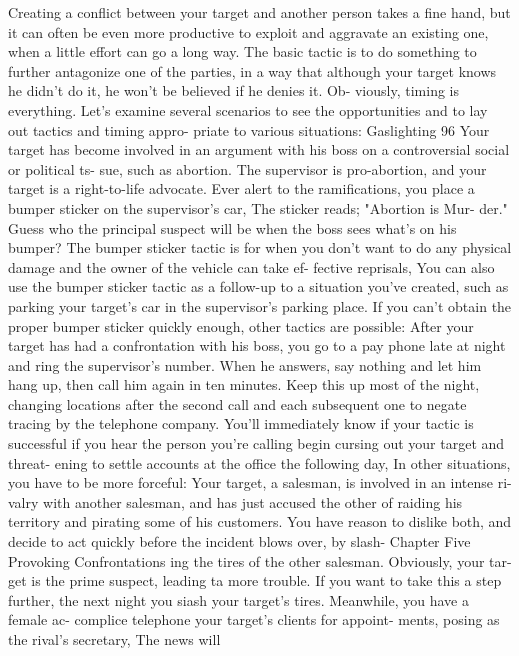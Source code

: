 \documentclass{book}
\begin{document}
Creating a conflict between your target and another person 
takes a fine hand, but it can often be even more productive to 
exploit and aggravate an existing one, when a little effort can 
go a long way. The basic tactic is to do something to further 
antagonize one of the parties, in a way that although your target 
knows he didn't do it, he won't be believed if he denies it. Ob- 
viously, timing is everything. Let's examine several scenarios to 
see the opportunities and to lay out tactics and timing appro- 
priate to various situations:  Gaslighting 
96 
Your target has become involved in an argument 
with his boss on a controversial social or political ts- 
sue, such as abortion. The supervisor is pro-abortion, 
and your target is a right-to-life advocate. Ever alert to 
the ramifications, you place a bumper sticker on the 
supervisor's car, The sticker reads; "Abortion is Mur- 
der." Guess who the principal suspect will be when the 
boss sees what's on his bumper? 
The bumper sticker tactic is for when you don't want to do 
any physical damage and the owner of the vehicle can take ef- 
fective reprisals, You can also use the bumper sticker tactic as a 
follow-up to a situation you've created, such as parking your 
target's car in the supervisor's parking place. If you can't obtain 
the proper bumper sticker quickly enough, other tactics are 
possible: 
After your target has had a confrontation with his 
boss, you go to a pay phone late at night and ring the 
supervisor's number. When he answers, say nothing 
and let him hang up, then call him again in ten minutes. 
Keep this up most of the night, changing locations after 
the second call and each subsequent one to negate 
tracing by the telephone company. You'll immediately 
know if your tactic is successful if you hear the person 
you're calling begin cursing out your target and threat- 
ening to settle accounts at the office the following day, 
In other situations, you have to be more forceful: 
Your target, a salesman, is involved in an intense ri- 
valry with another salesman, and has just accused the 
other of raiding his territory and pirating some of his 
customers. You have reason to dislike both, and decide 
to act quickly before the incident blows over, by slash- 
Chapter Five 
Provoking Confrontations 
ing the tires of the other salesman. Obviously, your tar- 
get is the prime suspect, leading ta more trouble. If you 
want to take this a step further, the next night you siash 
your target's tires. Meanwhile, you have a female ac- 
complice telephone your target's clients for appoint- 
ments, posing as the rival's secretary, The news will 
\end{document}
